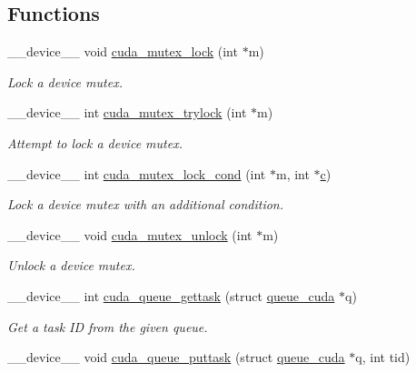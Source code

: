 \subsection*{Functions}
\begin{DoxyCompactItemize}
\item 
\-\_\-\-\_\-device\-\_\-\-\_\- void \hyperlink{runner__cuda_8cu_aea4f0251309d40830f5fb37a015eebd3}{cuda\-\_\-mutex\-\_\-lock} (int $\ast$m)
\begin{DoxyCompactList}\small\item\em Lock a device mutex. \end{DoxyCompactList}\item 
\-\_\-\-\_\-device\-\_\-\-\_\- int \hyperlink{runner__cuda_8cu_a5b8f0605e3985b926f1c040d39034b8b}{cuda\-\_\-mutex\-\_\-trylock} (int $\ast$m)
\begin{DoxyCompactList}\small\item\em Attempt to lock a device mutex. \end{DoxyCompactList}\item 
\-\_\-\-\_\-device\-\_\-\-\_\- int \hyperlink{runner__cuda_8cu_a0110545814e100d0d65c4f6cd94d7639}{cuda\-\_\-mutex\-\_\-lock\-\_\-cond} (int $\ast$m, int $\ast$\hyperlink{potential__eval_8h_ad31d5daa8211ce879a18991ef555f2f3}{c})
\begin{DoxyCompactList}\small\item\em Lock a device mutex with an additional condition. \end{DoxyCompactList}\item 
\-\_\-\-\_\-device\-\_\-\-\_\- void \hyperlink{runner__cuda_8cu_a2552c4e328a29ee844960efbf70c9051}{cuda\-\_\-mutex\-\_\-unlock} (int $\ast$m)
\begin{DoxyCompactList}\small\item\em Unlock a device mutex. \end{DoxyCompactList}\item 
\-\_\-\-\_\-device\-\_\-\-\_\- int \hyperlink{runner__cuda_8cu_af7b7097ec53ae42d307b4a9152c2253d}{cuda\-\_\-queue\-\_\-gettask} (struct \hyperlink{structqueue__cuda}{queue\-\_\-cuda} $\ast$q)
\begin{DoxyCompactList}\small\item\em Get a task I\-D from the given queue. \end{DoxyCompactList}\item 
\-\_\-\-\_\-device\-\_\-\-\_\- void \hyperlink{runner__cuda_8cu_ad674fe3f07a1bf103db57106fde5a0f0}{cuda\-\_\-queue\-\_\-puttask} (struct \hyperlink{structqueue__cuda}{queue\-\_\-cuda} $\ast$q, int tid)

\end{DoxyCompactItemize}
